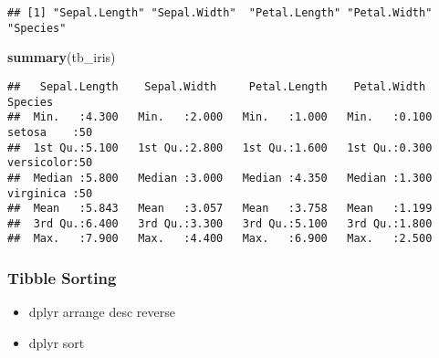 \documentclass[
]{book}
\newenvironment{Shaded}{\begin{snugshade}}{\end{snugshade}}
\newcommand{\CommentTok}[1]{\textcolor[rgb]{0.56,0.35,0.01}{\textit{#1}}}
\newcommand{\DecValTok}[1]{\textcolor[rgb]{0.00,0.00,0.81}{#1}}
\newcommand{\KeywordTok}[1]{\textcolor[rgb]{0.13,0.29,0.53}{\textbf{#1}}}
\newcommand{\NormalTok}[1]{#1}
\newcommand{\OperatorTok}[1]{\textcolor[rgb]{0.81,0.36,0.00}{\textbf{#1}}}
\newcommand{\StringTok}[1]{\textcolor[rgb]{0.31,0.60,0.02}{#1}}
\providecommand{\tightlist}{%
  \setlength{\itemsep}{0pt}\setlength{\parskip}{0pt}}
\begin{document}
\begin{verbatim}
## [1] "Sepal.Length" "Sepal.Width"  "Petal.Length" "Petal.Width"  "Species"
\end{verbatim}

\begin{Shaded}
\begin{Highlighting}[]
\KeywordTok{summary}\NormalTok{(tb_iris)}
\end{Highlighting}
\end{Shaded}

\begin{verbatim}
##   Sepal.Length    Sepal.Width     Petal.Length    Petal.Width          Species  
##  Min.   :4.300   Min.   :2.000   Min.   :1.000   Min.   :0.100   setosa    :50  
##  1st Qu.:5.100   1st Qu.:2.800   1st Qu.:1.600   1st Qu.:0.300   versicolor:50  
##  Median :5.800   Median :3.000   Median :4.350   Median :1.300   virginica :50  
##  Mean   :5.843   Mean   :3.057   Mean   :3.758   Mean   :1.199                  
##  3rd Qu.:6.400   3rd Qu.:3.300   3rd Qu.:5.100   3rd Qu.:1.800                  
##  Max.   :7.900   Max.   :4.400   Max.   :6.900   Max.   :2.500
\end{verbatim}

\hypertarget{tibble-sorting}{%
\subsubsection{Tibble Sorting}\label{tibble-sorting}}

\begin{itemize}
\tightlist
\item
  dplyr arrange desc reverse
\item
  dplyr sort
\end{itemize}

\begin{Shaded}
\end{Shaded}
\end{document}
